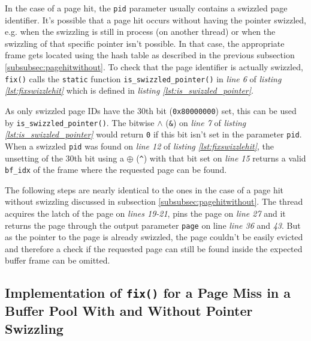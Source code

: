 	 In the case of a page hit, the \lstinline{pid} parameter usually contains a swizzled page identifier. It's possible that a page hit occurs without having the pointer swizzled, e.g. when the swizzling is still in process (on another thread) or when the swizzling of that specific pointer isn't possible. In that case, the appropriate frame gets located using the hash table as described in the previous subsection \ref{subsubsec:pagehitwithout}. To check that the page identifier is actually swizzled, \lstinline{fix()} calls the \lstinline{static} function \lstinline{is_swizzled_pointer()} in \emph{line 6} of \emph{listing \ref{lst:fixswizzlehit}} which is defined in \emph{listing \ref{lst:is_swizzled_pointer}}.

\begin{@empty}
	\lstset{
		language = [ISO]C++,
		style = basic
	}
	\begin{code}[ht!]
		\caption{Implementation of \lstinline{bf_tree_m::is_swizzled_pointer()}} \label{lst:is_swizzled_pointer}
		
	\end{code}
\end{@empty}	
	
	As only swizzled page IDs have the 30th bit (\lstinline{0x80000000}) set, this can be used by \lstinline{is_swizzled_pointer()}. The bitwise $\wedge$ (\lstinline{&}) on \emph{line 7} of \emph{listing \ref{lst:is_swizzled_pointer}} would return \lstinline{0} if this bit isn't set in the parameter \lstinline{pid}. When a swizzled \lstinline{pid} was found on \emph{line 12} of \emph{listing \ref{lst:fixswizzlehit}}, the unsetting of the 30th bit using a $\oplus$ (\lstinline{^}) with that bit set on \emph{line 15} returns a valid \lstinline{bf_idx} of the frame where the requested page can be found.
	
	The following steps are nearly identical to the ones in the case of a page hit without swizzling discussed in subsection \ref{subsubsec:pagehitwithout}. The thread acquires the latch of the page on \emph{lines 19-21}, pins the page on \emph{line 27} and it returns the page through the output parameter \lstinline{page} on line \emph{line 36} and \emph{43}. But as the pointer to the page is already swizzled, the page couldn't be easily evicted and therefore a check if the requested page can still be found inside the expected buffer frame can be omitted.

\subsection[Comparison of the Implementations for a Page Miss]{Implementation of \lstinline{fix()} for a Page Miss in a Buffer Pool With and Without Pointer Swizzling} \label{subsec:pagemiss}


